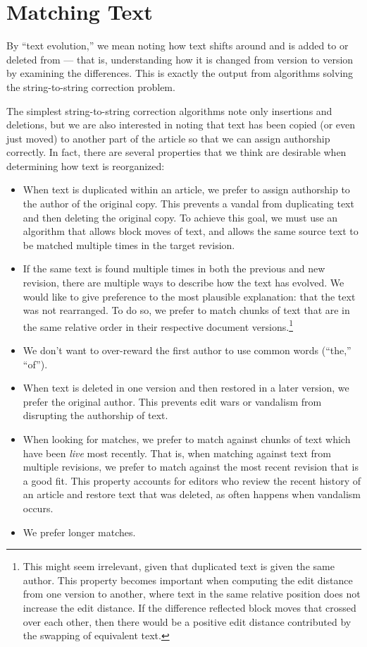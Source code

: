 \section{Matching Text}

By ``text evolution,'' we mean noting how text shifts
around and is added to or deleted from --- that is,
understanding how it is changed from version to version
by examining the differences.
This is exactly the output from algorithms solving the
string-to-string correction problem.

The simplest string-to-string correction algorithms
note only insertions and deletions, but we are also interested
in noting that text has been copied (or even just moved)
to another part of the article so that we can assign authorship
correctly.
In fact, there are several properties that we think are desirable
when determining how text is reorganized:
\begin{itemize}
\item When text is duplicated within an article, we prefer to assign
    authorship to the author of the original copy.
    This prevents a vandal from duplicating text and then deleting the
    original copy.
    To achieve this goal, we must use an algorithm that allows
    block moves of text, and allows the same source text to be
    matched multiple times in the target revision.
\item If the same text is found multiple times in both the previous
    and new revision, there are multiple ways to describe how the
    text has evolved.
    We would like to give preference to the most plausible explanation:
    that the text was not rearranged.
    To do so, we prefer to match chunks of text that are in the
    same relative order in their respective document
    versions.\footnote{This might seem irrelevant, given that duplicated
    text is given the same author.  This property becomes important
    when computing the edit distance from one version to another,
    where text in the same relative position does not increase the
    edit distance.  If the difference reflected block moves that
    crossed over each other, then there would be a positive edit
    distance contributed by the swapping of equivalent text.}
\item We don't want to over-reward the first author to use common
    words (\eg ``the,'' ``of'').
\item When text is deleted in one version and then restored in a later
    version, we prefer the original author.
    This prevents edit wars or vandalism from disrupting the
    authorship of text.
\item When looking for matches, we prefer to match against chunks
    of text which have been \textit{live} most recently.
    That is, when matching against text from multiple revisions,
    we prefer to match against the most recent revision that is
    a good fit.
    This property accounts for editors who review the recent history
    of an article and restore text that was deleted, as often happens
    when vandalism occurs.
\item We prefer longer matches.
\end{itemize}


